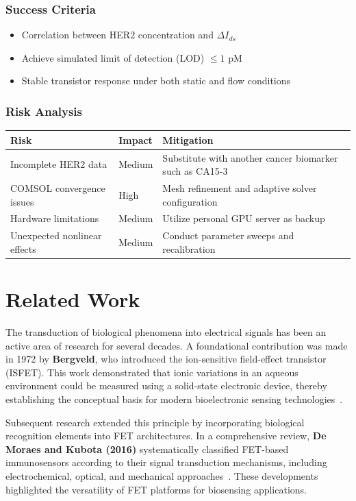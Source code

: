 \documentclass[12pt,a4paper]{report}
\begin{document}
\subsection{Success Criteria}
\begin{itemize}
  \item Correlation between HER2 concentration and \( \Delta I_{ds} \)
  \item Achieve simulated limit of detection (LOD) $\leq 1$ pM
  \item Stable transistor response under both static and flow conditions
\end{itemize}

\subsection{Risk Analysis}
\begin{center}
\begin{tabular}{|p{4cm}|p{3cm}|p{6cm}|}
\hline
\textbf{Risk} & \textbf{Impact} & \textbf{Mitigation} \\
\hline
Incomplete HER2 data & Medium & Substitute with another cancer biomarker such as CA15-3 \\
COMSOL convergence issues & High & Mesh refinement and adaptive solver configuration \\
Hardware limitations & Medium & Utilize personal GPU server as backup\\
Unexpected nonlinear effects & Medium & Conduct parameter sweeps and recalibration \\
\hline
\end{tabular}
\end{center}

\chapter{Related Work}

The transduction of biological phenomena into electrical signals has been an active area of research for several decades. A foundational contribution was made in 1972 by \textbf{Bergveld}, who introduced the ion-sensitive field-effect transistor (ISFET). This work demonstrated that ionic variations in an aqueous environment could be measured using a solid-state electronic device, thereby establishing the conceptual basis for modern bioelectronic sensing technologies~\cite{bergveld1972}.

Subsequent research extended this principle by incorporating biological recognition elements into FET architectures. In a comprehensive review, \textbf{De Moraes and Kubota (2016)} systematically classified FET-based immunosensors according to their signal transduction mechanisms, including electrochemical, optical, and mechanical approaches~\cite{demoraes2016}. These developments highlighted the versatility of FET platforms for biosensing applications.
\end{document}
